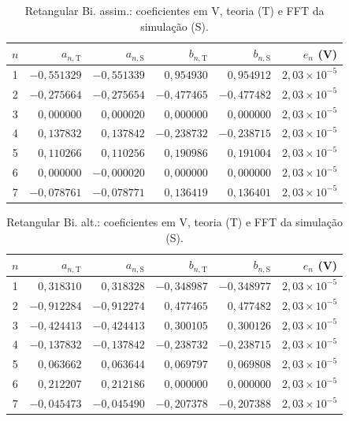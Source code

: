 \begin{table}[H]
\centering
\footnotesize\setlength{\tabcolsep}{2pt}
\caption{Retangular Bi. assim.: coeficientes em V, teoria (T) e FFT da simulação (S).}\label{tab:coef_comp23}
\begin{tabular}{crrrrr}\hline
$n$ & $a_{n,\mathrm T}$ & $a_{n,\mathrm S}$ & $b_{n,\mathrm T}$ & $b_{n,\mathrm S}$ & $e_n$ (V) \\ \hline
1 & $-0{,}551329$ & $-0{,}551339$ & $0{,}954930$ & $0{,}954912$ & $2{,}03\!\times\!10^{-5}$ \\
2 & $-0{,}275664$ & $-0{,}275654$ & $-0{,}477465$ & $-0{,}477482$ & $2{,}03\!\times\!10^{-5}$ \\
3 & $0{,}000000$ & $0{,}000020$ & $0{,}000000$ & $0{,}000000$ & $2{,}03\!\times\!10^{-5}$ \\
4 & $0{,}137832$ & $0{,}137842$ & $-0{,}238732$ & $-0{,}238715$ & $2{,}03\!\times\!10^{-5}$ \\
5 & $0{,}110266$ & $0{,}110256$ & $0{,}190986$ & $0{,}191004$ & $2{,}03\!\times\!10^{-5}$ \\
6 & $0{,}000000$ & $-0{,}000020$ & $0{,}000000$ & $0{,}000000$ & $2{,}03\!\times\!10^{-5}$ \\
7 & $-0{,}078761$ & $-0{,}078771$ & $0{,}136419$ & $0{,}136401$ & $2{,}03\!\times\!10^{-5}$ \\
\hline\end{tabular}
\end{table}
\begin{table}[H]
\centering
\footnotesize\setlength{\tabcolsep}{2pt}
\caption{Retangular Bi. alt.: coeficientes em V, teoria (T) e FFT da simulação (S).}\label{tab:coef_comp24}
\begin{tabular}{crrrrr}\hline
$n$ & $a_{n,\mathrm T}$ & $a_{n,\mathrm S}$ & $b_{n,\mathrm T}$ & $b_{n,\mathrm S}$ & $e_n$ (V) \\ \hline
1 & $0{,}318310$ & $0{,}318328$ & $-0{,}348987$ & $-0{,}348977$ & $2{,}03\!\times\!10^{-5}$ \\
2 & $-0{,}912284$ & $-0{,}912274$ & $0{,}477465$ & $0{,}477482$ & $2{,}03\!\times\!10^{-5}$ \\
3 & $-0{,}424413$ & $-0{,}424413$ & $0{,}300105$ & $0{,}300126$ & $2{,}03\!\times\!10^{-5}$ \\
4 & $-0{,}137832$ & $-0{,}137842$ & $-0{,}238732$ & $-0{,}238715$ & $2{,}03\!\times\!10^{-5}$ \\
5 & $0{,}063662$ & $0{,}063644$ & $0{,}069797$ & $0{,}069808$ & $2{,}03\!\times\!10^{-5}$ \\
6 & $0{,}212207$ & $0{,}212186$ & $0{,}000000$ & $0{,}000000$ & $2{,}03\!\times\!10^{-5}$ \\
7 & $-0{,}045473$ & $-0{,}045490$ & $-0{,}207378$ & $-0{,}207388$ & $2{,}03\!\times\!10^{-5}$ \\
\hline\end{tabular}
\end{table}
